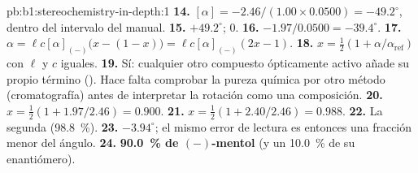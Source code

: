 \begin{solution}{pb:b1:stereochemistry-in-depth:1}
\textbf{14.} $[\alpha] = -2.46/(1.00 \times 0.0500) = -49.2^\circ$, dentro
del intervalo del manual.
\textbf{15.} $+49.2^\circ$; $0$.
\textbf{16.} $-1.97/0.0500 = -39.4^\circ$.
\textbf{17.} $\alpha = \ell c[\alpha]_{(-)}\bigl(x - (1 - x)\bigr) =
\ell c[\alpha]_{(-)}(2x - 1)$.
\textbf{18.} $x = \frac12(1 + \alpha/\alpha_{\text{ref}})$ con $\ell$ y $c$
iguales.
\textbf{19.} Sí: cualquier otro compuesto ópticamente activo añade su
propio término (). Hace falta comprobar la pureza química por
otro método (cromatografía) antes de interpretar la rotación como una
composición.
\textbf{20.} $x = \frac12(1 + 1.97/2.46) = 0.900$.
\textbf{21.} $x = \frac12(1 + 2.40/2.46) = 0.988$.
\textbf{22.} La segunda (\qty{98.8}{\percent}).
\textbf{23.} $-3.94^\circ$; el mismo error de lectura es entonces una
fracción menor del ángulo.
\textbf{24.} \textbf{\qty{90.0}{\percent} de $(-)$-mentol} (y un
\qty{10.0}{\percent} de su enantiómero).
\end{solution}
